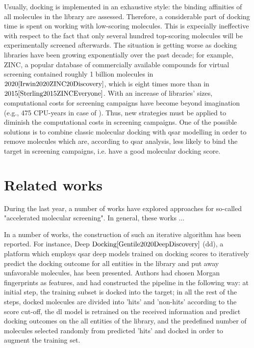 Usually, docking is implemented in an exhaustive style: the binding affinities of 
all molecules in the library are assessed.
Therefore, a considerable part of docking time is spent on working with low-scoring 
molecules.
This is expecially ineffective with respect to the fact that only several hundred top-scoring molecules will be experimentally screened afterwards.
The situation is getting worse as docking libraries have been growing exponentially 
over the past decade; for example, ZINC, a popular database of commercially available 
compounds for virtual screening contained roughly 1 billion molecules in $2020{\cite{Irwin2020ZINC20Discovery}}$, 
which is eight times more than in $2015{\cite{Sterling2015ZINCEveryone}}$.
With an increase of libraries' sizes, computational costs for screening campaigns 
have become beyond imagination (e.g.,  475 CPU-years in case of \cite{Gorgulla2020AnScreens}).
Thus, new strategies must be applied to diminish the computational costs in screening 
campaigns.
One of the possible solutions is to combine classic molecular docking with \acrshort{qsar} 
modelling in order to remove molecules which are, according to \acrshort{qsar} analysis, 
less likely to bind the target in screening campaigns, i.e. have a good molecular docking score.\\

\section{Related works}
During the last year, a number of works have explored approaches for so-called "accelerated molecular screening".
In general, these works ... 

In a number of works, the construction of such an iterative algorithm has been reported.
For instance, Deep $\text{Docking}{\cite{Gentile2020DeepDiscovery}}$ (\acrshort{dd}), 
a platform which employs \acrshort{qsar} deep models trained on docking scores to 
iteratively predict the docking outcome for all entities in the library and put 
away unfavorable molecules, has been presented.
Authors had chosen Morgan fingerprints as features, and had constructed the pipeline 
in the following way: at initial step, the training subset is docked into the target; 
in all the rest of the steps, docked molecules are divided into 'hits' and 'non-hits' 
according to the score cut-off, the \acrshort{dl} model is retrained on the received 
information and predict docking outcomes on the all entities of the library, and 
the predefined number of molecules selected randomly from predicted 'hits' and docked 
in order to augment the training set.\\


